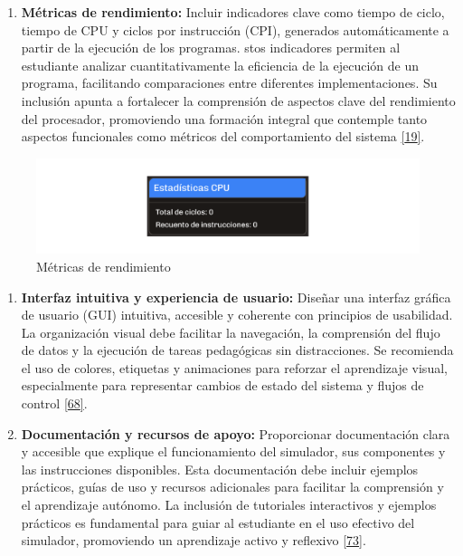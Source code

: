 \documentclass[12pt,oneside]{templates/unerthesis}
\providecommand{\tightlist}{%
  \setlength{\itemsep}{0pt}\setlength{\parskip}{0pt}}
\begin{document}
\begin{enumerate}
\def\labelenumi{\arabic{enumi}.}
\setcounter{enumi}{5}
\tightlist
\item
  \textbf{Métricas de rendimiento:}
  Incluir indicadores clave como tiempo de ciclo, tiempo de CPU y ciclos por instrucción (CPI), generados automáticamente a partir de la ejecución de los programas. stos indicadores permiten al estudiante analizar cuantitativamente la eficiencia de la ejecución de un programa, facilitando comparaciones entre diferentes implementaciones. Su inclusión apunta a fortalecer la comprensión de aspectos clave del rendimiento del procesador, promoviendo una formación integral que contemple tanto aspectos funcionales como métricos del comportamiento del sistema \protect\hyperlink{ref-hennessy2017computer}{{[}19{]}}.
\end{enumerate}

\begin{figure}

{\centering \includegraphics[width=0.85\linewidth]{images/metricas} 

}

\caption{Métricas de rendimiento}\label{fig:metricas}
\end{figure}

\begin{enumerate}
\def\labelenumi{\arabic{enumi}.}
\setcounter{enumi}{6}
\item
  \textbf{Interfaz intuitiva y experiencia de usuario:}
  Diseñar una interfaz gráfica de usuario (GUI) intuitiva, accesible y coherente con principios de usabilidad. La organización visual debe facilitar la navegación, la comprensión del flujo de datos y la ejecución de tareas pedagógicas sin distracciones. Se recomienda el uso de colores, etiquetas y animaciones para reforzar el aprendizaje visual, especialmente para representar cambios de estado del sistema y flujos de control \protect\hyperlink{ref-w3c_accessibility_2021}{{[}68{]}}.
\item
  \textbf{Documentación y recursos de apoyo:}
  Proporcionar documentación clara y accesible que explique el funcionamiento del simulador, sus componentes y las instrucciones disponibles. Esta documentación debe incluir ejemplos prácticos, guías de uso y recursos adicionales para facilitar la comprensión y el aprendizaje autónomo. La inclusión de tutoriales interactivos y ejemplos prácticos es fundamental para guiar al estudiante en el uso efectivo del simulador, promoviendo un aprendizaje activo y reflexivo \protect\hyperlink{ref-bonwell1991active}{{[}73{]}}.
\end{enumerate}
\end{document}
